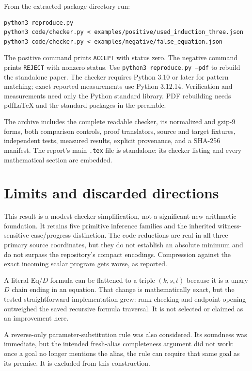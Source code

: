 \documentclass[10pt,letterpaper]{article}
\theoremstyle{definition}
\theoremstyle{remark}
\begin{document}
From the extracted package directory run:
\begin{lstlisting}
python3 reproduce.py
python3 code/checker.py < examples/positive/used_induction_three.json
python3 code/checker.py < examples/negative/false_equation.json
\end{lstlisting}
The positive command prints \texttt{ACCEPT} with status zero. The negative
command prints \texttt{REJECT} with nonzero status.
Use \texttt{python3 reproduce.py --pdf} to rebuild the standalone paper.
The checker requires Python 3.10 or later for pattern matching; exact
reported measurements use Python 3.12.14. Verification and measurements
need only the Python standard library. PDF rebuilding needs pdfLaTeX
and the standard packages in the preamble.

The archive includes the complete readable checker, its normalized and
gzip-9 forms, both comparison controls, proof translators, source and
target fixtures, independent tests, measured results, explicit provenance,
and a SHA-256 manifest. The report's main \texttt{.tex} file is standalone:
its checker listing and every mathematical section are embedded.

\section{Limits and discarded directions}

This result is a modest checker simplification, not a significant new
arithmetic foundation. It retains five primitive inference families and
the inherited witness-sensitive case/progress distinction. The code
reductions are real in all three primary source coordinates, but they
do not establish an absolute minimum and do not surpass the repository's
compact encodings. Compression against the exact incoming scalar program
gets worse, as reported.

A literal Eq/$D$ formula can be flattened to a triple $(k,s,t)$ because it
is a unary $D$ chain ending in an equation. That change is mathematically
exact, but the tested straightforward implementation grew: rank checking
and endpoint opening outweighed the saved recursive formula traversal.
It is not selected or claimed as an improvement here.

A reverse-only parameter-substitution rule was also considered. Its
soundness was immediate, but the intended fresh-alias completeness
argument did not work: once a goal no longer mentions the alias, the
rule can require that same goal as its premise. It is excluded from this
construction.
\end{document}
